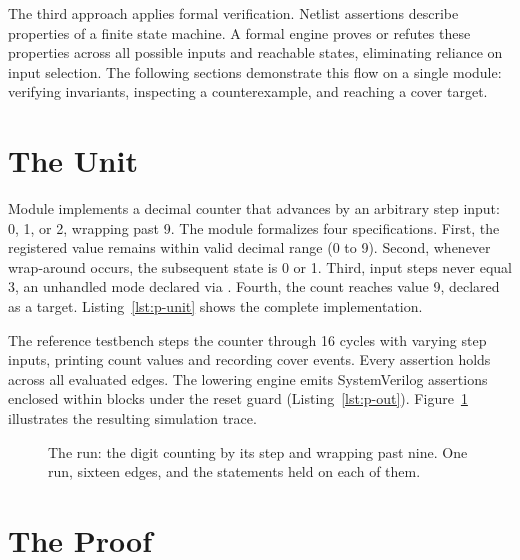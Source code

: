 \documentclass[journal,9pt]{IEEEtran}
\begin{document}
The third approach applies formal verification. Netlist assertions describe
properties of a finite state machine. A formal engine proves or refutes these
properties across all possible inputs and reachable states, eliminating
reliance on input selection. The following sections demonstrate this flow on a
single module: verifying invariants, inspecting a counterexample, and reaching a
cover target.

\section{The Unit}
\label{sec:p-unit}

Module  implements a decimal counter that advances by an
arbitrary step input: 0, 1, or 2, wrapping past 9. The module formalizes four
specifications. First, the registered value remains within valid decimal range
(0 to 9). Second, whenever wrap-around occurs, the subsequent state is 0 or 1.
Third, input steps never equal 3, an unhandled mode declared via .
Fourth, the count reaches value 9, declared as a  target.
Listing~\ref{lst:p-unit} shows the complete implementation.



The reference testbench steps the counter through 16 cycles with varying step
inputs, printing count values and recording cover events. Every assertion holds
across all evaluated edges. The lowering engine emits SystemVerilog assertions
enclosed within  blocks under the reset guard
(Listing~\ref{lst:p-out}). Figure~\ref{fig:p-run} illustrates the resulting
simulation trace.



\begin{figure}[t]
\centering

\caption{The run: the digit counting by its step and wrapping past
nine. One run, sixteen edges, and the statements held on each of
them.}
\label{fig:p-run}
\end{figure}

\section{The Proof}
\label{sec:p-proof}
\end{document}
